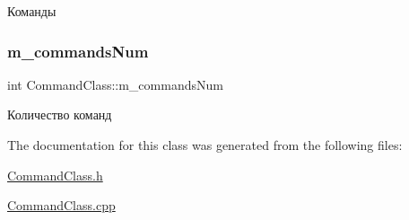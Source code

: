 Команды 

\mbox{\label{class_command_class_a1f3d88378858d9ca0d301b811e27c595}} 
\subsubsection{\texorpdfstring{m\+\_\+commands\+Num}{m\_commandsNum}}
{\footnotesize\ttfamily int Command\+Class\+::m\+\_\+commands\+Num\hspace{0.3cm}{\ttfamily [private]}}



Количество команд 



The documentation for this class was generated from the following files\+:\begin{DoxyCompactItemize}
\item 
\hyperlink{_command_class_8h}{Command\+Class.\+h}\item 
\hyperlink{_command_class_8cpp}{Command\+Class.\+cpp}\end{DoxyCompactItemize}
